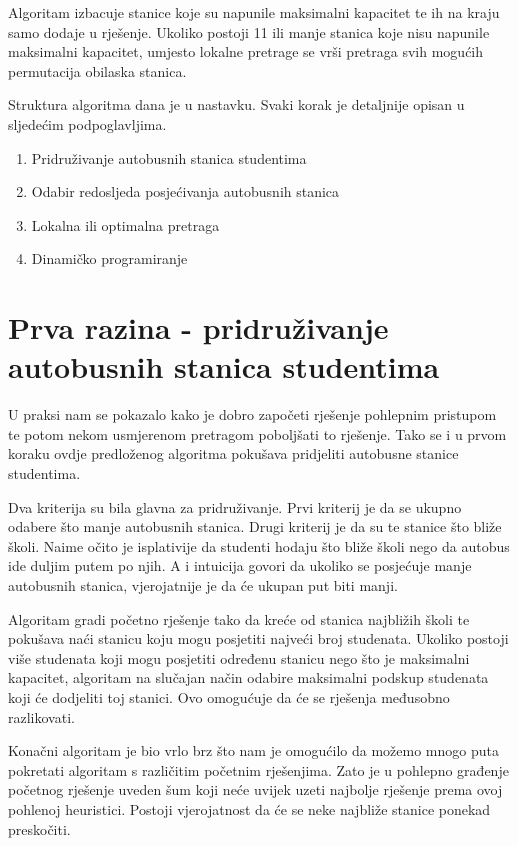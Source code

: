 \documentclass[times, utf8, seminar, numeric]{fer}
\begin{document}
Algoritam izbacuje stanice koje su napunile maksimalni kapacitet te ih na kraju samo dodaje u rješenje. Ukoliko postoji 11 ili manje stanica koje nisu napunile maksimalni kapacitet, umjesto lokalne pretrage se vrši pretraga svih mogućih permutacija obilaska stanica.

Struktura algoritma dana je u nastavku. Svaki korak je detaljnije opisan u sljedećim podpoglavljima.

\begin{enumerate}
\item Pridruživanje autobusnih stanica studentima
\item Odabir redosljeda posjećivanja autobusnih stanica
\item Lokalna ili optimalna pretraga
\item Dinamičko programiranje
\end{enumerate}

\section{Prva razina - pridruživanje autobusnih stanica studentima}
U praksi nam se pokazalo kako je dobro započeti rješenje pohlepnim pristupom te potom nekom usmjerenom pretragom poboljšati to rješenje. Tako se i u prvom koraku ovdje predloženog algoritma pokušava pridjeliti autobusne stanice studentima.

Dva kriterija su bila glavna za pridruživanje. Prvi kriterij je da se ukupno odabere što manje autobusnih stanica. Drugi kriterij je da su te stanice što bliže školi. Naime očito je isplativije da studenti hodaju što bliže školi nego da autobus ide duljim putem po njih. A i intuicija govori da ukoliko se posjećuje manje autobusnih stanica, vjerojatnije je da će ukupan put biti manji.

Algoritam gradi početno rješenje tako da kreće od stanica najbližih školi te pokušava naći stanicu koju mogu posjetiti najveći broj studenata. Ukoliko postoji više studenata koji mogu posjetiti određenu stanicu nego što je maksimalni kapacitet, algoritam na slučajan način odabire maksimalni podskup studenata koji će dodjeliti toj stanici. Ovo omogućuje da će se rješenja međusobno razlikovati.

Konačni algoritam je bio vrlo brz što nam je omogućilo da možemo mnogo puta pokretati algoritam s različitim početnim rješenjima. Zato je u pohlepno građenje početnog rješenje uveden šum koji neće uvijek uzeti najbolje rješenje prema ovoj pohlenoj heuristici. Postoji vjerojatnost da će se neke najbliže stanice ponekad preskočiti.
\end{document}
